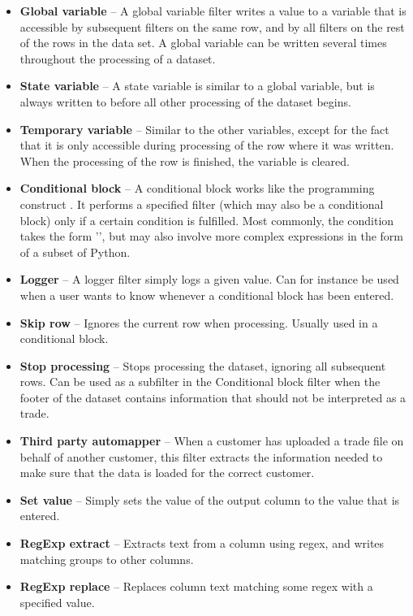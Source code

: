 \begin{itemize}
\item \textbf{Global variable} --
A global variable filter writes a value to a variable that is accessible by subsequent filters on the same row, and by all filters on the rest of the rows in the data
set. A global variable can be written several times throughout the processing of a dataset.

\item \textbf{State variable} --
A state variable is similar to a global variable, but is always written to before all other processing of the dataset begins.

\item \textbf{Temporary variable} --
Similar to the other variables, except for the fact that it is only accessible during processing of the row where it was written. When the 
processing of the row is finished, the variable is cleared.

\item \textbf{Conditional block} --
A conditional block works like the programming construct . It performs a specified filter (which may also be a conditional block) only if a certain
condition is fulfilled. Most commonly, the condition takes the form '', but may also involve more complex expressions in the form of a
subset of Python.

\item \textbf{Logger} --
A logger filter simply logs a given value. Can for instance be used when a user wants to know whenever a conditional block has been entered.

\item \textbf{Skip row} --
Ignores the current row when processing. Usually used in a conditional block.

\item \textbf{Stop processing} --
Stops processing the dataset, ignoring all subsequent rows. Can be used as a subfilter in the Conditional block filter when the footer of the dataset
contains information that should not be interpreted as a trade.

\item \textbf{Third party automapper} --
When a customer has uploaded a trade file on behalf of another customer, this filter extracts the information needed to make sure that the data is loaded
for the correct customer.

\item \textbf{Set value} --
Simply sets the value of the output column to the value that is entered.

\item \textbf{RegExp extract} --
Extracts text from a column using regex, and writes matching groups to other columns.

\item \textbf{RegExp replace} --
Replaces column text matching some regex with a specified value.

\end{itemize}


